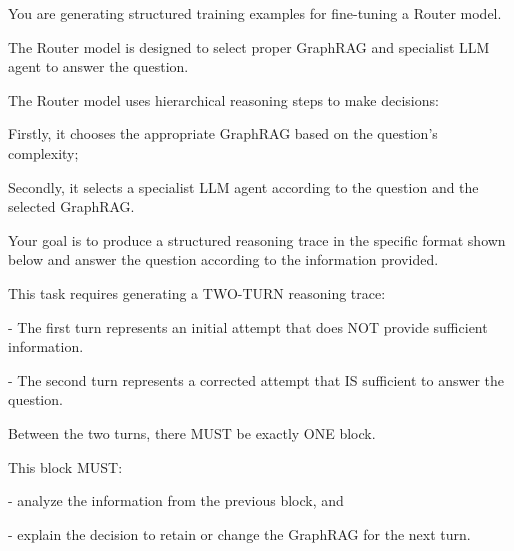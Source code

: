 \label{fig:generation-prompt}





\begin{tcolorbox}[
    mygreenbox,
    enhanced jigsaw,
    width=\textwidth,
    title={Self-Reflection Trace Generation Prompt},
    fonttitle=\Large\bfseries,
    before upper={
        \setlength{\parindent}{0pt}
        \setlength{\parskip}{0pt}
    }
]

You are generating structured training examples for fine-tuning a Router model.\par\noindent
The Router model is designed to select proper GraphRAG and specialist LLM agent to answer the question.\par\noindent

\medskip
The Router model uses hierarchical reasoning steps to make decisions:\par\noindent
Firstly, it chooses the appropriate GraphRAG based on the question's complexity;\par\noindent
Secondly, it selects a specialist LLM agent according to the question and the selected GraphRAG.\par\noindent

\medskip
Your goal is to produce a structured reasoning trace in the specific format shown below
and answer the question according to the information provided.\par\noindent

\medskip
This task requires generating a TWO-TURN reasoning trace:\par\noindent
\quad - The first turn represents an initial attempt that does NOT provide sufficient information.\par\noindent
\quad - The second turn represents a corrected attempt that IS sufficient to answer the question.\par\noindent

\medskip
Between the two turns, there MUST be exactly ONE  block. \par\noindent
This  block MUST: \par\noindent
\quad - analyze the information from the previous  block, and \par\noindent
\quad - explain the decision to retain or change the GraphRAG for the next turn. \par\noindent


\end{tcolorbox}
